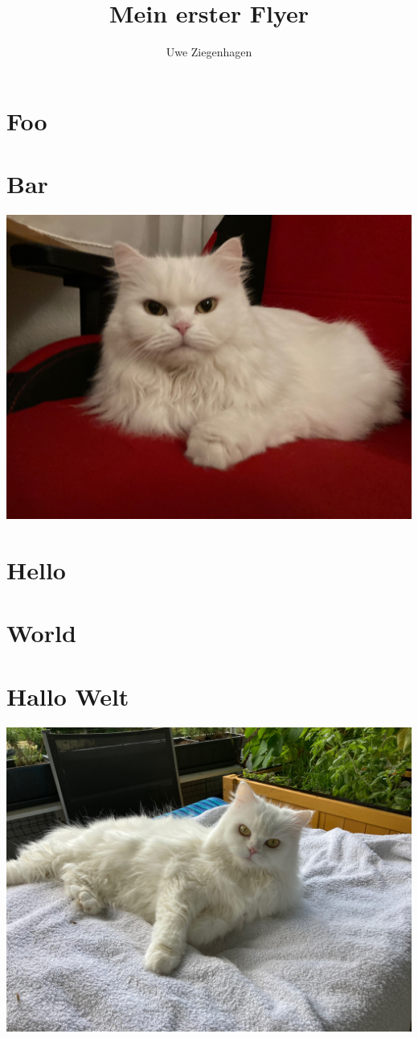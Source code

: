 \documentclass[12pt,ngerman]{leaflet}
\author{Uwe Ziegenhagen}
\title{Mein erster Flyer}
\begin{document}
\maketitle

\section{Foo}

\blindtext[2]

\section{Bar}

\includegraphics[width=\textwidth]{./Bilder/Katze2}

\blindtext

\section{Hello}

\blindtext[4]

\section{World}

\blindtext

\section{Hallo Welt}

\blindtext

\includegraphics[width=\textwidth]{./Bilder/Katze1}
\end{document}
